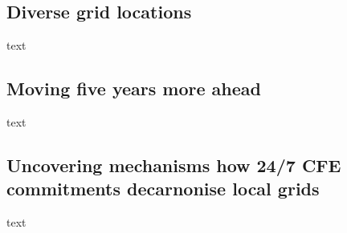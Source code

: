 \subsection{Diverse grid locations}
\label{subsec:location}

text 

\subsection{Moving five years more ahead}
\label{subsec:time}

text 

\subsection{Uncovering mechanisms how 24/7 CFE commitments decarnonise local grids}
\label{subsec:mechanisms}

text 

